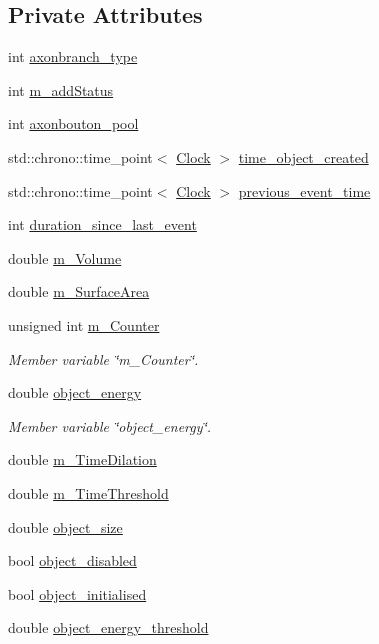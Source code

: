 \subsection*{Private Attributes}
\begin{DoxyCompactItemize}
\item 
int \mbox{\hyperlink{classAxonBranch_a7ecf92c68997eb344c1d6e8c9ba92cfb}{axonbranch\+\_\+type}}
\item 
int \mbox{\hyperlink{classAxonBranch_a5c1ab609b7887ee437d9c1fbc6960fc5}{m\+\_\+add\+Status}}
\item 
int \mbox{\hyperlink{classAxonBranch_adccee24d22600a90f3507477e6ef63af}{axonbouton\+\_\+pool}}
\item 
std\+::chrono\+::time\+\_\+point$<$ \mbox{\hyperlink{universe_8h_a0ef8d951d1ca5ab3cfaf7ab4c7a6fd80}{Clock}} $>$ \mbox{\hyperlink{classAxonBranch_af57a6117490f6cf20ba22c9d107cabfb}{time\+\_\+object\+\_\+created}}
\item 
std\+::chrono\+::time\+\_\+point$<$ \mbox{\hyperlink{universe_8h_a0ef8d951d1ca5ab3cfaf7ab4c7a6fd80}{Clock}} $>$ \mbox{\hyperlink{classAxonBranch_a6a1607a44a26b4277a7f0fc32cafb530}{previous\+\_\+event\+\_\+time}}
\item 
int \mbox{\hyperlink{classAxonBranch_a98d317c3a02b1bbca631d102e9cb8d39}{duration\+\_\+since\+\_\+last\+\_\+event}}
\item 
double \mbox{\hyperlink{classAxonBranch_a9751ecf633d28c0cc33b3538e95e5ff3}{m\+\_\+\+Volume}}
\item 
double \mbox{\hyperlink{classAxonBranch_a7ef58cc007435db340fbbbb37f9f0201}{m\+\_\+\+Surface\+Area}}
\item 
unsigned int \mbox{\hyperlink{classAxonBranch_a1f5e38be0828557a63972092d61eb001}{m\+\_\+\+Counter}}
\begin{DoxyCompactList}\small\item\em Member variable \char`\"{}m\+\_\+\+Counter\char`\"{}. \end{DoxyCompactList}\item 
double \mbox{\hyperlink{classAxonBranch_a50c032dbd82cf1aad10cf51c90993361}{object\+\_\+energy}}
\begin{DoxyCompactList}\small\item\em Member variable \char`\"{}object\+\_\+energy\char`\"{}. \end{DoxyCompactList}\item 
double \mbox{\hyperlink{classAxonBranch_ab737e5ee5c9209de468e061a1a84c148}{m\+\_\+\+Time\+Dilation}}
\item 
double \mbox{\hyperlink{classAxonBranch_a962453447332826acf0bdef49cd70a7f}{m\+\_\+\+Time\+Threshold}}
\item 
double \mbox{\hyperlink{classAxonBranch_a7c7b6c5f08a20bc956d37b01b183c4d8}{object\+\_\+size}}
\item 
bool \mbox{\hyperlink{classAxonBranch_ac71332a4fcf5fbe1e58647ac09945f39}{object\+\_\+disabled}}
\item 
bool \mbox{\hyperlink{classAxonBranch_a6f7a66fc08c4b829e4f14fde6177c4ab}{object\+\_\+initialised}}
\item 
double \mbox{\hyperlink{classAxonBranch_a3278f6e24660f62018b5afd7280f1575}{object\+\_\+energy\+\_\+threshold}}
\end{DoxyCompactItemize}
